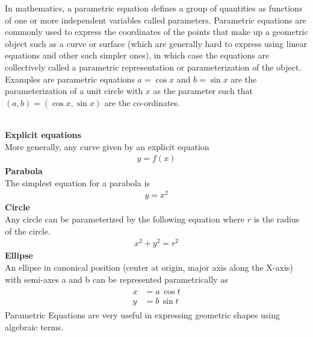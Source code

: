\begin{mathbox}{}
{In mathematics, a parametric equation defines a group of quantities as functions of one or more independent variables called parameters. Parametric equations are commonly used to express the coordinates of the points that make up a geometric object such as a curve or surface (which are generally hard to express using linear equations and other such simpler ones), in which case the equations are collectively called a parametric representation or parameterization of the object.\\
Examples are parametric equations $a=\cos x$ and $b=\sin x$ are the parameterization of a unit circle with $x$ as the parameter such that $(a,b) = (\cos x, \sin x)$ are the co-ordinates.\\
\begin{center}
\end{center}\\
\textbf{Explicit equations}\\
More generally, any curve given by an explicit equation
\begin{align*}
{\displaystyle y=f(x)}    
\end{align*}
\textbf{Parabola}\\
The simplest equation for a parabola is
\begin{align*}
    {\displaystyle y=x^{2}}
\end{align*}
\textbf{Circle}\\
Any circle can be parameterized by the following equation where $r$ is the radius of the circle.
\begin{align*}
{\displaystyle x^{2}+y^{2}=r^2}    
\end{align*}
\textbf{Ellipse}\\
An ellipse in canonical position (center at origin, major axis along the X-axis) with semi-axes a and b can be represented parametrically as
\begin{align*}
{\displaystyle {\begin{aligned}x&=a\,\cos t\\y&=b\,\sin t\end{aligned}}}    
\end{align*}
Parametric Equations are very useful in expressing geometric shapes using algebraic terms.}
\end{mathbox}
